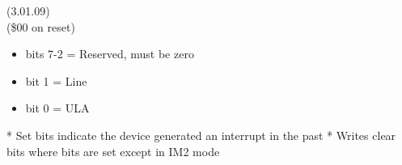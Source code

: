  (3.01.09)\\
(\$00 on reset)
\begin{itemize}
\item bits 7-2 = Reserved, must be zero
\item bit 1 = Line
\item bit 0 = ULA
\end{itemize}
* Set bits indicate the device generated an interrupt in the past
* Writes clear bits where bits are set except in IM2 mode

